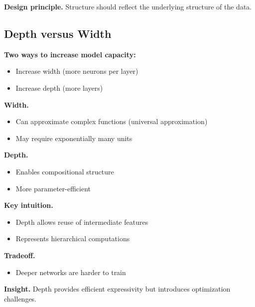 \medskip

\noindent
\textbf{Design principle.}  
Structure should reflect the underlying structure of the data.

\subsection{Depth versus Width}

\textbf{Two ways to increase model capacity:}

\begin{itemize}
    \item Increase width (more neurons per layer)
    \item Increase depth (more layers)
\end{itemize}

\medskip

\noindent
\textbf{Width.}
\begin{itemize}
    \item Can approximate complex functions (universal approximation)
    \item May require exponentially many units
\end{itemize}

\medskip

\noindent
\textbf{Depth.}
\begin{itemize}
    \item Enables compositional structure
    \item More parameter-efficient
\end{itemize}

\medskip

\noindent
\textbf{Key intuition.}

\begin{itemize}
    \item Depth allows reuse of intermediate features
    \item Represents hierarchical computations
\end{itemize}

\medskip

\noindent
\textbf{Tradeoff.}
\begin{itemize}
    \item Deeper networks are harder to train
\end{itemize}

\medskip

\noindent
\textbf{Insight.}  
Depth provides efficient expressivity but introduces optimization challenges.

